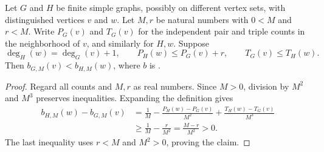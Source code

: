 \begin{lemma}
Let $G$ and $H$ be finite simple graphs, possibly on different vertex sets,
with distinguished vertices $v$ and $w$. Let $M,r$ be natural numbers with
$0<M$ and $r<M$. Write $P_G(v)$ and $T_G(v)$ for the independent pair and
triple counts in the neighborhood of $v$, and similarly for $H,w$.
Suppose
\[
\deg_H(w)=\deg_G(v)+1,\qquad
P_H(w)\le P_G(v)+r,\qquad T_G(v)\le T_H(w).
\]
Then $b_{G,M}(v)<b_{H,M}(w)$, where $b$ is
.
\end{lemma}
\begin{proof}
Regard all counts and $M,r$ as real numbers. Since $M>0$, division by
$M^2$ and $M^3$ preserves inequalities. Expanding the definition gives
\[
\begin{aligned}
b_{H,M}(w)-b_{G,M}(v)
&=\frac{1}{M}-\frac{P_H(w)-P_G(v)}{M^2}
  +\frac{T_H(w)-T_G(v)}{M^3}\\
&\ge\frac{1}{M}-\frac{r}{M^2}
 =\frac{M-r}{M^2}>0.
\end{aligned}
\]
The last inequality uses $r<M$ and $M^2>0$, proving the claim.
\end{proof}
